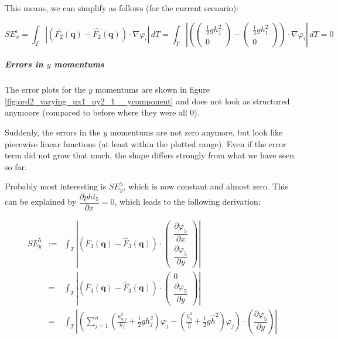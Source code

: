\documentclass{article}
\newcommand{\pd}[2]{\dfrac{\partial #1}{\partial #2}}
\renewcommand{\phi}{\varphi}
\begin{document}
This means, we can simplify as follows (for the current scenario):

\begin{equation*}
  SE_x^i = \int_T \left| \left(\overline{F_2}(\mathbf{q}) - \widehat{F_2}(\mathbf{q})\right) \cdot \nabla \phi_i \right|\, dT = \int_T \left|
    \left(
      \begin{pmatrix}
        \frac{1}{2} g h_1^2 \\ 0
      \end{pmatrix} -
      \begin{pmatrix}
        \frac{1}{2} g h_1^2 \\ 0
      \end{pmatrix}
    \right)
    \cdot \nabla \phi_i \right|\, dT =
  0
\end{equation*}

\subparagraph{\texorpdfstring{Errors in $y$ momentums}{Errors in y momentums}}

The error plots for the $y$ momentums are shown in figure \ref{fig:ord2_varying_ux1_uy2_1__ycomponent} and does not look as structured anymoore (compared to before where they were all 0).



Suddenly, the errors in the $y$ momentums are not zero anymore, but look like piecewise linear functions (at least within the plotted range). Even if the error term did not grow that much, the shape differs strongly from what we have seen so far.

Probably most interesting is $SE_y^5$, which is now constant and almost zero. This can be explained by $\pd{phi_5}{x}=0$, which leads to the following derivation:

\begin{eqnarray*}
  SE_y^5 & := & \int_T \left| \left(\overline{F}_3\left(\mathbf{q}\right) - \widehat{F}_3\left(\mathbf{q}\right)\right) \cdot \begin{pmatrix}\pd{\phi_5}{x} \\ \pd{\phi_5}{y}\end{pmatrix}\right| \\
  {} & = & \int_T \left| \left(\overline{F}_3\left(\mathbf{q}\right) - \widehat{F}_3\left(\mathbf{q}\right)\right) \cdot \begin{pmatrix}0 \\ \pd{\phi_5}{y}\end{pmatrix}\right| \\
  {} & = & \int_T \left| \left( \sum_{j=1}^n \left(\frac{u_{y,j}^2}{h_j} + \frac{1}{2} g h_j^2\right) \phi_j - \left( \frac{\widehat{u}_y^2}{\widehat{h}} + \frac{1}{2} g \widehat{h}^2 \right) \phi_j \right) \cdot \left(\pd{\phi_5}{y}\right) \right| \\
\end{eqnarray*}
\end{document}
